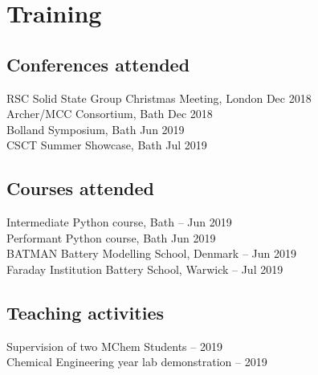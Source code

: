 \section*{Training}
\thispagestyle{plain}
\subsection*{Conferences attended}
RSC Solid State Group Christmas Meeting, London \dotfill Dec 2018\\
Archer/MCC Consortium, Bath \dotfill Dec 2018\\
Bolland Symposium, Bath \dotfill Jun 2019\\
CSCT Summer Showcase, Bath \dotfill Jul 2019

\subsection*{Courses attended}
Intermediate Python course, Bath \dotfill {}-- Jun 2019\\
Performant Python course, Bath \dotfill {} Jun 2019\\
BATMAN Battery Modelling School, Denmark \dotfill {}-- Jun 2019\\
Faraday Institution Battery School, Warwick \dotfill {}-- Jul 2019

\subsection*{Teaching activities}
Supervision of two MChem Students  -- 2019\\
Chemical Engineering  year lab demonstration  -- 2019\\